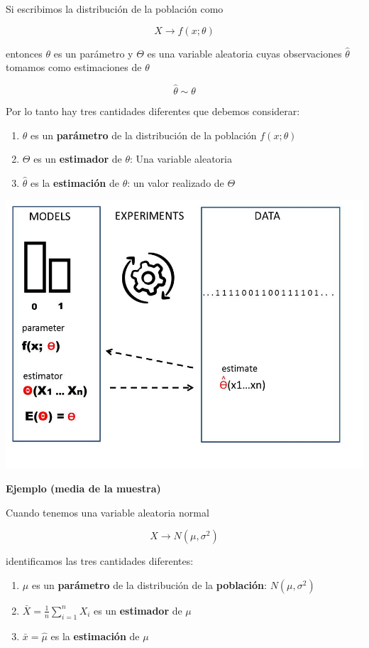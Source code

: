 \documentclass[
]{book}
\providecommand{\tightlist}{%
  \setlength{\itemsep}{0pt}\setlength{\parskip}{0pt}}
\begin{document}
Si escribimos la distribución de la población como

\[X \rightarrow f(x; \theta)\]

entonces \(\theta\) es un parámetro y \(\Theta\) es una variable aleatoria cuyas observaciones \(\hat{\theta}\) tomamos como estimaciones de \(\theta\)

\[\hat{\theta} \sim \theta\]

Por lo tanto hay tres cantidades diferentes que debemos considerar:

\begin{enumerate}
\def\labelenumi{\arabic{enumi}.}
\tightlist
\item
  \(\theta\) es un \textbf{parámetro} de la distribución de la población \(f(x; \theta)\)
\item
  \(\Theta\) es un \textbf{estimador} de \(\theta\): Una variable aleatoria
\item
  \(\hat{\theta}\) es la \textbf{estimación} de \(\theta\): un valor realizado de \(\Theta\)
\end{enumerate}

\includegraphics{./figures/estimator.JPG}

\textbf{Ejemplo (media de la muestra)}

Cuando tenemos una variable aleatoria normal

\[X \rightarrow N(\mu, \sigma^2)\]

identificamos las tres cantidades diferentes:

\begin{enumerate}
\def\labelenumi{\arabic{enumi}.}
\tightlist
\item
  \(\mu\) es un \textbf{parámetro} de la distribución de la \textbf{población}: \(N(\mu, \sigma^2)\)
\item
  \(\bar{X}=\frac{1}{n} \sum_{i=1}^n X_i\) es un \textbf{estimador} de \(\mu\)
\item
  \(\bar{x}=\hat{\mu}\) es la \textbf{estimación} de \(\mu\)
\end{enumerate}
\end{document}
